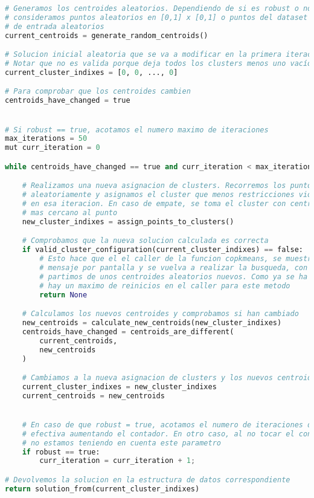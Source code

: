 \documentclass[11pt]{article}
\begin{document}
\begin{lstlisting}[language=Python, style=Boxed]
# Generamos los centroides aleatorios. Dependiendo de si es robust o no
# consideramos puntos aleatorios en [0,1] x [0,1] o puntos del dataset
# de entrada aleatorios
current_centroids = generate_random_centroids()

# Solucion inicial aleatoria que se va a modificar en la primera iteracion
# Notar que no es valida porque deja todos los clusters menos uno vacíos
current_cluster_indixes = [0, 0, ..., 0]

# Para comprobar que los centroides cambien
centroids_have_changed = true


# Si robust == true, acotamos el numero maximo de iteraciones
max_iterations = 50
mut curr_iteration = 0

while centroids_have_changed == true and curr_iteration < max_iterations{

    # Realizamos una nueva asignacion de clusters. Recorremos los puntos
    # aleatoriamente y asignamos el cluster que menos restricciones viole
    # en esa iteracion. En caso de empate, se toma el cluster con centroide
    # mas cercano al punto
    new_cluster_indixes = assign_points_to_clusters()

    # Comprobamos que la nueva solucion calculada es correcta
    if valid_cluster_configuration(current_cluster_indixes) == false:
        # Esto hace que el el caller de la funcion copkmeans, se muestre un
        # mensaje por pantalla y se vuelva a realizar la busqueda, con lo que
        # partimos de unos centroides aleatorios nuevos. Como ya se ha comentado,
        # hay un maximo de reinicios en el caller para este metodo
        return None

    # Calculamos los nuevos centroides y comprobamos si han cambiado
    new_centroids = calculate_new_centroids(new_cluster_indixes)
    centroids_have_changed = centroids_are_different(
        current_centroids,
        new_centroids
    )

    # Cambiamos a la nueva asignacion de clusters y los nuevos centroides
    current_cluster_indixes = new_cluster_indixes
    current_centroids = new_centroids


    # En caso de que robust = true, acotamos el numero de iteraciones de forma
    # efectiva aumentando el contador. En otro caso, al no tocar el contador
    # no estamos teniendo en cuenta este parametro
    if robust == true:
        curr_iteration = curr_iteration + 1;

# Devolvemos la solucion en la estructura de datos correspondiente
return solution_from(current_cluster_indixes)
\end{lstlisting}
\end{document}
